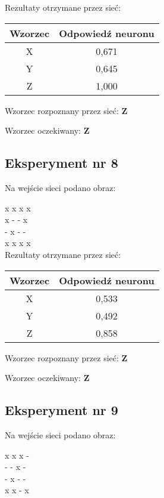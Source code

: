 \documentclass[12pt]{article}
\begin{document}
Rezultaty otrzymane przez sieć:

\begin{table}[h]
\begin{tabular}{|c|c|}
\hline 
Wzorzec & Odpowiedź neuronu \\ 
\hline 
X & 0,671 \\ \hline 
Y & 0,645 \\ \hline 
Z & 1,000 \\ \hline 
\end{tabular} 
\end{table}

Wzorzec rozpoznany przez sieć: \textbf{Z}

Wzorzec oczekiwany: \textbf{Z}

\subsection{Eksperyment nr 8}

Na wejście sieci podano obraz:

\noindent
x x x x \\
x - - x \\
- x - - \\
x x x x \\

Rezultaty otrzymane przez sieć:

\begin{table}[h]
\begin{tabular}{|c|c|}
\hline 
Wzorzec & Odpowiedź neuronu \\ 
\hline 
X & 0,533 \\ \hline 
Y & 0,492 \\ \hline 
Z & 0,858 \\ \hline 
\end{tabular} 
\end{table}

Wzorzec rozpoznany przez sieć: \textbf{Z}

Wzorzec oczekiwany: \textbf{Z}

\clearpage

\subsection{Eksperyment nr 9}

Na wejście sieci podano obraz:

\noindent
x x x - \\
- - x - \\
- x - - \\
x x - x \\
\end{document}
